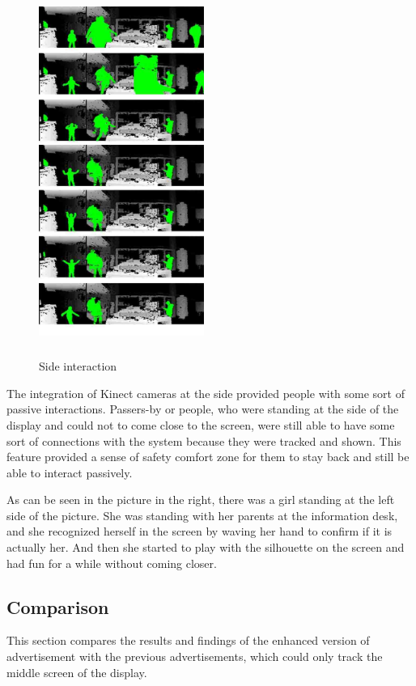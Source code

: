\begin{figure}
  \vspace{-30pt}
  \begin{center}
    \includegraphics[width=0.48\textwidth,height=120mm]{Figures/9/effects/playing}
  \end{center}
  \vspace{-20pt}
  \caption{Side interaction}
  \vspace{-60pt}
\end{figure}
The integration of Kinect cameras at the side provided people with some sort of passive interactions. Passers-by or people, who were standing at the side of the display and could not to come close to the screen, were still able to have some sort of connections with the system because they were tracked and shown. This feature provided a sense of safety comfort zone for them to stay back and still be able to interact passively. 

As can be seen in the picture in the right, there was a girl standing at the left side of the picture. She was standing with her parents at the information desk, and she recognized herself in the screen by waving her hand to confirm if it is actually her. And then she started to play with the silhouette on the screen and had fun for a while without coming closer.
\break
\break
\break
\break

\subsection{Comparison}
This section compares the results and findings of the enhanced version of advertisement with the previous advertisements, which could only track the middle screen of the display. 

